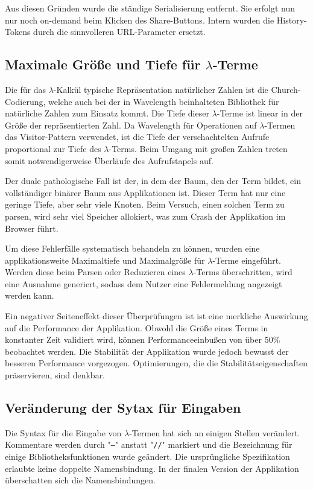 \documentclass[parskip=full,11pt,openany]{scrreprt}
\begin{document}
Aus diesen Gründen wurde die ständige Serialisierung entfernt. Sie erfolgt nun nur noch on-demand beim Klicken
des Share-Buttons. Intern wurden die History-Tokens durch die sinnvolleren URL-Parameter ersetzt.

\subsection{Maximale Größe und Tiefe für $\lambda$-Terme}
Die für das $\lambda$-Kalkül typische Repräsentation natürlicher Zahlen ist die
Church-Codierung, welche auch bei der in Wavelength beinhalteten Bibliothek für
natürliche Zahlen zum Einsatz kommt. Die Tiefe dieser $\lambda$-Terme ist linear
in der Größe der repräsentierten Zahl. Da Wavelength für Operationen auf
$\lambda$-Termen das Visitor-Pattern verwendet, ist die Tiefe der
verschachtelten Aufrufe proportional zur Tiefe des $\lambda$-Terms. Beim Umgang mit großen
Zahlen treten somit notwendigerweise Überläufe des Aufrufstapels auf.

Der duale pathologische Fall ist der, in dem der Baum, den der Term bildet,
ein vollständiger binärer Baum aus Applikationen ist. Dieser Term hat nur eine
geringe Tiefe, aber sehr viele Knoten. Beim Versuch, einen solchen Term zu
parsen, wird sehr viel Speicher allokiert, was zum Crash der Applikation im
Browser führt.

Um diese Fehlerfälle systematisch behandeln zu können, wurden eine applikationsweite
Maximaltiefe und Maximalgröße für $\lambda$-Terme eingeführt. Werden diese beim Parsen oder Reduzieren
eines $\lambda$-Terms überschritten, wird eine Ausnahme generiert, sodass dem
Nutzer eine Fehlermeldung angezeigt werden kann.

Ein negativer Seiteneffekt dieser Überprüfungen ist ist eine merkliche Auswirkung
auf die Performance der Applikation. Obwohl die Größe eines Terms in konstanter Zeit
validiert wird, können Performanceeinbußen von über 50\% beobachtet werden. Die
Stabilität der Applikation wurde jedoch bewusst der besseren Performance vorgezogen.
Optimierungen, die die Stabilitätseigenschaften präservieren, sind denkbar.

\subsection{Veränderung der Sytax für Eingaben}
Die Syntax für die Eingabe von $\lambda$-Termen hat sich an einigen Stellen verändert. 
Kommentare werden durch "\texttt{--}" anstatt "\texttt{//}" markiert\label{changeComment} 
und die Bezeichnung für einige Bibliotheksfunktionen wurde geändert\label{changeBib}. 
Die ursprüngliche Spezifikation erlaubte keine doppelte Namensbindung. 
In der finalen Version der Applikation überschatten sich die Namensbindungen\label{changeBinding}.
\end{document}
